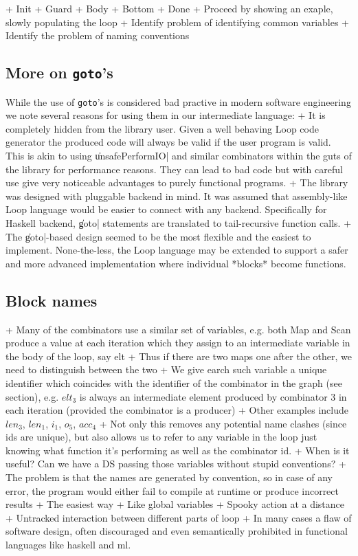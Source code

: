 \documentclass[preamble.tex]{subfiles}
\begin{document}
+ Init
+ Guard
+ Body
+ Bottom
+ Done
+ Proceed by showing an exaple, slowly populating the loop
+ Identify problem of identifying common variables
+ Identify the problem of naming conventions

\subsection{More on \texttt{goto}'s}

While the use of \texttt{goto}'s is considered bad practive in modern software engineering we note several reasons for using them in our intermediate language:
+ It is completely hidden from the library user. Given a well behaving Loop code generator the produced code will always be valid if the user program is valid. This is akin to using \|unsafePerformIO| and similar combinators within the guts of the library for performance reasons. They can lead to bad code but with careful use give very noticeable advantages to purely functional programs.
+ The library was designed with pluggable backend in mind. It was assumed that assembly-like Loop language would be easier to connect with any backend. Specifically for Haskell backend, \|goto| statements are translated to tail-recursive function calls.
+ The \|goto|-based design seemed to be the most flexible and the easiest to implement. None-the-less, the Loop language may be extended to support a safer and more advanced implementation where individual *blocks* become functions.


\subsection{Block names}


+ Many of the combinators use a similar set of variables, e.g. both Map and Scan produce a value at each iteration which they assign to an intermediate variable in the body of the loop, say elt
+ Thus if there are two maps one after the other, we need to distinguish between the two
+ We give earch such variable a unique identifier which coincides with the identifier of the combinator in the graph (see section), e.g. $elt_3$ is always an intermediate element produced by combinator 3 in each iteration (provided the combinator is a producer)
+ Other examples include $len_3$, $len_1$, $i_1$, $o_5$, $acc_4$
+ Not only this removes any potential name clashes (since ids are unique), but also allows us to refer to any variable in the loop just knowing what function it's performing as well as the combinator id.
+ When is it useful? Can we have a DS passing those variables without stupid conventions?
+ The problem is that the names are generated by convention, so in case of any error, the program would either fail to compile at runtime or produce incorrect results
+ The easiest way 
+ Like global variables
+ Spooky action at a distance
+ Untracked interaction between different parts of loop
+ In many cases a flaw of software design, often discouraged and even semantically prohibited in functional languages like haskell and ml.
\end{document}
